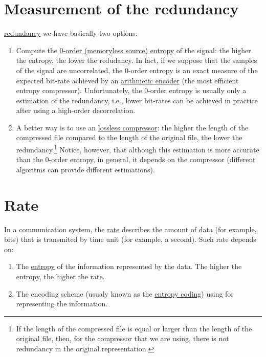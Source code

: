\section{Measurement of the redundancy}
\href{https://en.wikipedia.org/wiki/Redundancy_(information_theory)}{redundancy}
we have basically two options:
\begin{enumerate}
\item Compute the
  \href{https://en.wikipedia.org/wiki/Entropy_(information_theory)}{0-order
    (memoryless source) entropy} of the signal: the higher the
  entropy, the lower the redudancy. In fact, if we suppose that the
  samples of the signal are uncorrelated, the 0-order entropy is an
  exact measure of the expected bit-rate achieved by an
  \href{https://en.wikipedia.org/wiki/Arithmetic_coding}{arithmetic
    encoder} (the most efficient entropy compressor). Unfortunately,
  the 0-order entropy is usually only a estimation of the redundancy,
  i.e., lower bit-rates can be achieved in practice after using a high-order
  decorrelation.
\item A better way is to use an
  \href{https://en.wikipedia.org/wiki/Data_compression}{lossless
    compressor}: the higher the length of the compressed file compared
  to the length of the original file, the lower the
  redundancy.\footnote{If the length of the compressed file is equal or
  larger than the length of the original file, then, for the compressor
  that we are using, there is not redundancy in the original
  representation.} Notice, however, that although this estimation is
  more accurate than the 0-order entropy, in general, it depends on the
  compressor (different algoritms can provide different
  estimations).
\end{enumerate}

\section{Rate}

In a communication system, the
\href{https://en.wikipedia.org/wiki/Bit_rate}{rate} describes the
amount of data (for example, bits) that is transmited by time unit
(for example, a second). Such rate depends on:
\begin{enumerate}
\item The
  \href{https://en.wikipedia.org/wiki/Entropy_(information_theory)}{entropy}
  of the information represented by the data. The higher the entropy,
  the higher the rate.
\item The encoding scheme (usualy known as the
  \href{https://en.wikipedia.org/wiki/Entropy_coding}{entropy coding})
  using for representing the information.
\end{enumerate}

